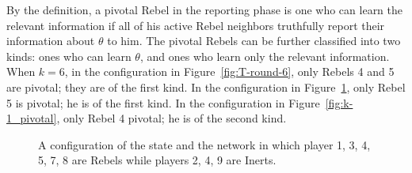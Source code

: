 \documentclass[12pt,letter]{article}
\theoremstyle{definition}
\theoremstyle{definition}
\theoremstyle{remark}
\theoremstyle{claim}
\begin{document}
By the definition, a pivotal Rebel in the reporting phase is one who can learn the relevant information if all of his active Rebel neighbors truthfully report their information about $\theta$ to him. The pivotal Rebels can be further classified into two kinds: ones who can learn $\theta$, and ones who learn only the relevant information. When $k=6$, in the configuration in Figure~\ref{fig:T-round-6}, only Rebels 4 and 5 are pivotal; they are of the first kind. In the configuration in Figure~\ref{fig:central_pivotal}, only Rebel 5 is pivotal; he is of the first kind. In the configuration in Figure~\ref{fig:k-1_pivotal}, only Rebel 4 pivotal; he is of the second kind.

%
%    
%    
%    
%        


\begin{figure}

\begin{center}
\end{center}
\caption{A configuration of the state and the network in which player 1, 3, 4, 5, 7, 8 are Rebels while players 2, 4, 9 are Inerts.}
\label{fig:central_pivotal}
\end{figure}
\end{document}
